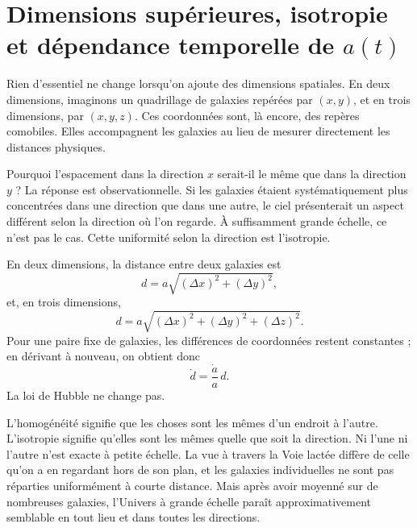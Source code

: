 \section{Dimensions supérieures, isotropie et dépendance temporelle de \(a(t)\)}

Rien d’essentiel ne change lorsqu’on ajoute des dimensions spatiales. En deux dimensions, imaginons un quadrillage de galaxies repérées par \((x,y)\), et en trois dimensions, par \((x,y,z)\). Ces coordonnées sont, là encore, des repères comobiles. Elles accompagnent les galaxies au lieu de mesurer directement les distances physiques.

Pourquoi l’espacement dans la direction \(x\) serait-il le même que dans la direction \(y\) ? La réponse est observationnelle. Si les galaxies étaient systématiquement plus concentrées dans une direction que dans une autre, le ciel présenterait un aspect différent selon la direction où l’on regarde. À suffisamment grande échelle, ce n’est pas le cas. Cette uniformité selon la direction est l’isotropie.

En deux dimensions, la distance entre deux galaxies est
\begin{equation}
d=a\sqrt{(\Delta x)^2+(\Delta y)^2},
\end{equation}
et, en trois dimensions,
\begin{equation}
d=a\sqrt{(\Delta x)^2+(\Delta y)^2+(\Delta z)^2}.
\end{equation}
Pour une paire fixe de galaxies, les différences de coordonnées restent constantes ; en dérivant à nouveau, on obtient donc
\begin{equation}
\dot d=\frac{\dot a}{a}\,d.
\end{equation}
La loi de Hubble ne change pas.

L’homogénéité signifie que les choses sont les mêmes d’un endroit à l’autre. L’isotropie signifie qu’elles sont les mêmes quelle que soit la direction. Ni l’une ni l’autre n’est exacte à petite échelle. La vue à travers la Voie lactée diffère de celle qu’on a en regardant hors de son plan, et les galaxies individuelles ne sont pas réparties uniformément à courte distance. Mais après avoir moyenné sur de nombreuses galaxies, l’Univers à grande échelle paraît approximativement semblable en tout lieu et dans toutes les directions.

